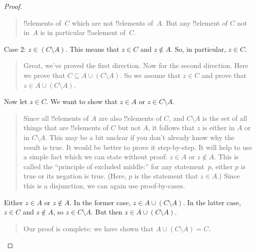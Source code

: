 \documentclass[../../../include/open-logic-section]{subfiles}
\begin{document}
\begin{proof}
\begin{quote}
    !!{element}s of~$C$ which are not !!{element}s of~$A$.  But any
    !!{element} of $C$ not in~$A$ is in particular !!a{element} of~$C$.
  \end{quote}
  Case 2: $z \in (C \setminus A)$.  This means that $z \in C$ and $z
  \notin A$. So, in particular, $z \in C$.
  \begin{quote}
    Great, we've proved the first direction. Now for the second
    direction. Here we prove that $C \subseteq A \cup (C \setminus
    A)$.  So we assume that $z \in C$ and prove that $z \in A \cup (C
    \setminus A)$.
  \end{quote}
  Now let $z \in C$. We want to show that $z \in A$ or $z \in C
  \setminus A$.
  \begin{quote}
    Since all !!{element}s of $A$ are also !!{element}s of $C$, and $C
    \setminus A$ is the set of all things that are !!{element}s of $C$
    but not $A$, it follows that $z$ is either in $A$ or in $C
    \setminus A$.  This may be a bit unclear if you don't already know
    why the result is true.  It would be better to prove it
    step-by-step.  It will help to use a simple fact which we can
    state without proof: $z \in A$ or $z \notin A$. This is called the
    ``principle of excluded middle:'' for any statement~$p$, either
    $p$ is true or its negation is true. (Here, $p$ is the statement
    that $z \in A$.)  Since this is a disjunction, we can again use
    proof-by-cases.
  \end{quote}
  Either $z \in A$ or $z \notin A$. In the former case, $z \in A \cup
  (C \setminus A)$. In the latter case, $z \in C$ and $z \notin A$, so
  $z \in C \setminus A$.  But then $z \in A \cup (C \setminus A)$.
  \begin{quote}
    Our proof is complete: we have shown that $A \cup (C \setminus A) = C$.
  \end{quote}
\end{proof}
\end{document}
